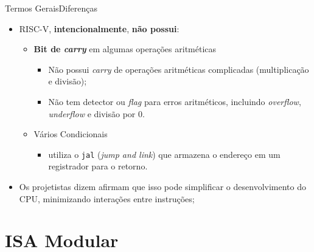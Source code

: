 \documentclass[red, aspectratio=169, xcolor=dvipsnames]{beamer}
\let\olditem=\item%
\renewcommand{\item}{\olditem \justifying}
\begin{document}
\begin{frame}{Termos Gerais}{Diferenças}
	\begin{itemize}
		\setlength{\itemsep}{1.2em}
		\item RISC-V, \textbf{intencionalmente}, \textbf{não possui}:
		
		\begin{itemize}
			\item \textbf{Bit de \textit{carry}} em algumas operações aritméticas
			\begin{itemize}
				\item Não possui \textit{carry} de operações aritméticas complicadas (multiplicação e divisão);
				\item Não tem detector ou \textit{flag} para erros aritméticos, incluindo \textit{overflow}, \textit{underflow} e divisão por 0.
			\end{itemize}
			
			\item Vários Condicionais
			\begin{itemize}
				\item utiliza o \texttt{jal} (\textit{jump and link}) que armazena o endereço em um registrador para o retorno.
			\end{itemize}
		\end{itemize}
		
		\item Os projetistas dizem afirmam que isso pode simplificar o desenvolvimento do CPU, minimizando interações entre instruções;

	\end{itemize}
\end{frame}



\section{ISA Modular}
\end{document}
